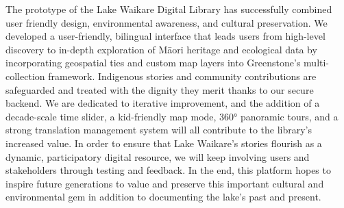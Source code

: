 ﻿%


The prototype of the Lake Waikare Digital Library has successfully combined user friendly design, environmental awareness, and cultural preservation.
We developed a user-friendly, bilingual interface that leads users from high-level discovery to in-depth exploration of Māori heritage and ecological data by incorporating geospatial ties and custom map layers into Greenstone's multi-collection framework.
Indigenous stories and community contributions are safeguarded and treated with the dignity they merit thanks to our secure backend.
We are dedicated to iterative improvement, and the addition of a decade-scale time slider, a kid-friendly map mode, 360° panoramic tours, and a strong translation management system will all contribute to the library's increased value.
In order to ensure that Lake Waikare's stories flourish as a dynamic, participatory digital resource, we will keep involving users and stakeholders through testing and feedback. In the end, this platform hopes to inspire future generations to value and preserve this important cultural and environmental gem in addition to documenting the lake's past and present.

